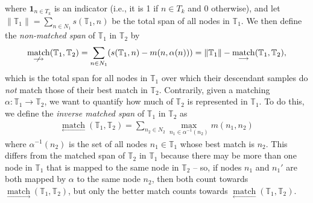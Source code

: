 \documentclass[10pt,twoside,lineno]{gsajnl}
\newcommand{\T}{\mathbb{T}}
\newcommand{\ind}{\mathbf{1}}
\newcommand{\match}{\underset{\longrightarrow}{\operatorname{match}}}
\newcommand{\invmatch}{\underset{\longleftarrow}{\operatorname{match}}}
\newcommand{\nmatch}{\underset{\centernot\longrightarrow}{\operatorname{match}}}
\begin{document}
where $\ind_{n \in T_k}$ is an indicator (i.e., it is 1 if $n \in T_k$ and 0 otherwise),
and let $\|\T_1\|=\sum_{n\in N_1}s(\T_1,n)$ be the total span of all nodes in $\T_1$.
We then define the \emph{non-matched span} of $\T_1$ in $\T_2$ by
\begin{align*}
	\nmatch(\T_1,\T_2)
	=
    \sum_{n \in N_1} (s(\T_1, n) - m(n, \alpha(n))) 
    = 
    \Vert \T_1\Vert -\match(\T_1,\T_2),
\end{align*}
which is the total span for all nodes in $\T_1$
over which their descendant samples do \emph{not} match
 those of their best match in $\T_2$.
Contrarily, given a matching $\alpha:\T_1\to\T_2$, 
we want to quantify how much of $\T_2$ is represented in $\T_1$.
To do this, we define the \emph{inverse matched span} of $\T_1$ in $\T_2$ as
\begin{align}\label{eqn:non-matched-spans}
	\invmatch(\T_1,\T_2) = \sum_{n_2\in N_2} \max_{n_1\in \alpha^{-1}(n_2)} m(n_1,n_2)
\end{align}
where $\alpha^{-1}(n_2)$ is the set of all nodes $n_1\in \T_1$ 
whose best match is $n_2$.  
This differs from the matched span of $\T_2$ in $\T_1$
because there may be more than one node in $\T_1$
that is mapped to the same node in $\T_2$ --
so, if nodes $n_1$ and $n_1'$ are both mapped by $\alpha$ to the same node $n_2$,
then both count towards $\match(\T_1,\T_2)$,
but only the better match counts towards $\invmatch(\T_1,\T_2)$.
\end{document}

